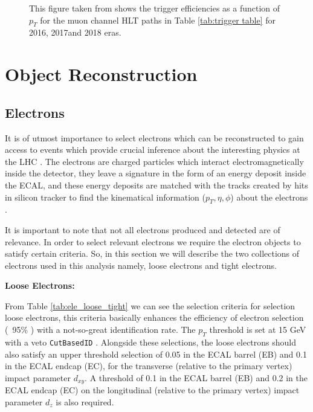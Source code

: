 \begin{figure}
    \qquad
    \caption{This figure taken from \cite{muontrigeff} shows the trigger efficiencies as a function of $p_{T}$ for the muon channel HLT paths in Table \ref{tab:trigger table} for 2016, 2017and 2018 eras.}%
    \label{analysis:mu_trig}%
\end{figure}
\section{Object Reconstruction}\label{analysis:objects reconstruction}

\subsection{Electrons}
It is of utmost importance to select electrons which can be reconstructed to gain access to events which provide crucial inference about the interesting physics at the LHC \cite{LHC}. The electrons are charged particles which interact electromagnetically inside the detector, they leave a signature in the form of an energy deposit inside the ECAL, and these energy deposits are matched with the tracks created by hits in silicon tracker to find the kinematical information ($p_{T}, \eta, \phi$) about the electrons \cite{elereco}.

It is important to note that not all electrons produced and detected are of relevance. In order to select relevant electrons we require the electron objects to satisfy certain criteria. So, in this section we will describe the two collections of electrons used in this analysis namely, loose electrons and tight electrons. 

\textbf{Loose Electrons:}

From Table \ref{tab:ele_loose_tight} we can see the selection criteria for selection loose electrons, this criteria basically enhances the efficiency of electron selection (~95\% \cite{cutbasedid}) with a not-so-great identification rate. The $p_{T}$ threshold is set at 15 GeV with a veto \verb|CutBasedID| \cite{cutbasedid}. Alongside these selections, the loose electrons should also satisfy an upper threshold selection of 0.05 in the ECAL barrel (EB) and 0.1 in the ECAL endcap (EC), for the transverse (relative to the primary vertex)  impact parameter $d_{xy}$. A threshold of 0.1 in the ECAL barrel (EB) and 0.2 in the ECAL endcap (EC) on the longitudinal (relative to the primary vertex) impact parameter $d_{z}$ is also required. 

